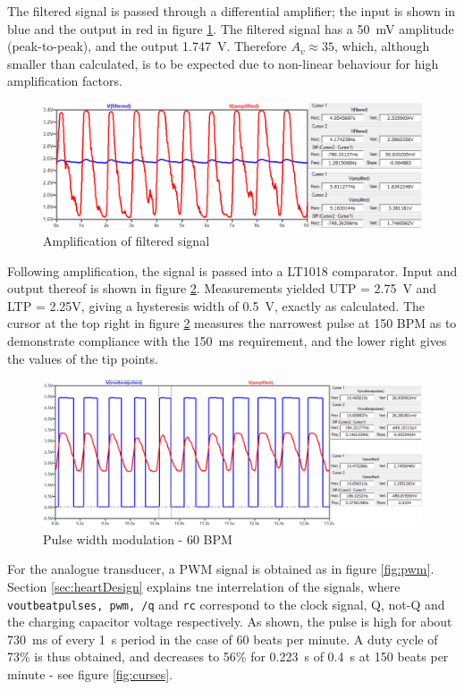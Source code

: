 The filtered signal is passed through a differential amplifier; the input is shown in blue and the output in red in figure \ref{fig:amplified}. The filtered signal has a \SI{50}{mV} amplitude (peak-to-peak), and the output \SI{1.747}{V}. Therefore $A_v \approx 35$, which, although smaller than calculated, is to be expected due to non-linear behaviour for high amplification factors. 
\begin{figure}
\centering
\includegraphics[width=\textwidth]{./Figures/amplified}
\caption{Amplification of filtered signal}
\label{fig:amplified}
\end{figure}

Following amplification, the signal is passed into a LT1018 comparator. Input and output thereof is shown in figure \ref{fig:pulses}. Measurements yielded UTP = \SI{2.75}{V} and LTP = {2.25}{V}, giving a hysteresis width of \SI{0.5}{V}, exactly as calculated. The cursor at the top right in figure \ref{fig:pulses} measures the narrowest pulse at 150 BPM as to demonstrate compliance with the \SI{150}{ms} requirement, and the lower right gives the values of the tip points.

\begin{figure}
\centering
\includegraphics[width=\textwidth]{./Figures/pulses}
\caption{Pulse width modulation - 60 BPM}
\label{fig:pulses}
\end{figure}

For the analogue transducer, a PWM signal is obtained as in figure \ref{fig:pwm}. Section \ref{sec:heartDesign} explains tne interrelation of the signals, where \texttt{voutbeatpulses, pwm, /q} and \texttt{rc} correspond to the clock signal, Q, not-Q and the charging capacitor voltage respectively. As shown, the pulse is high for about \SI{730}{ms} of every \SI{1}{s} period in the case of 60 beats per minute. A duty cycle of 73\% is thus obtained, and decreases to 56\% for \SI{0.223}{s} of \SI{0.4}{s} at 150 beats per minute - see figure \ref{fig:curses}.

